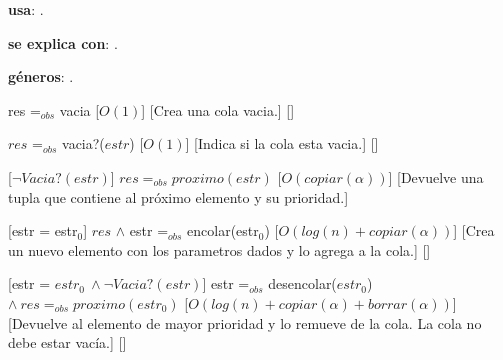 \begin{Interfaz}

  \textbf{usa}: .
  
  \textbf{se explica con}: .

  \textbf{g\'eneros}: .


  {res =$_{obs}$ vacia}%
  [$O(1)$]
  [Crea una cola vacia.]
  []

  {$res$ =$_{obs}$ vacia?($estr$)}%
  [$O(1)$]
  [Indica si la cola esta vacia.]
  []

  [$\neg Vacia?(estr)$]
  {$res =_{obs} proximo(estr)$}%
  [$O(copiar(\alpha))$]
  [Devuelve una tupla que contiene al pr\'oximo elemento y su prioridad.]
  

  [estr = estr$_0$]
  {$res$ $\wedge$ estr =$_{obs}$ encolar(estr$_0$)}%
  [$O(log(n) + copiar(\alpha))$]
  [Crea un nuevo elemento con los parametros dados y lo agrega a la cola.]
  []

  [estr = $estr_0 \ \wedge \neg Vacia?(estr)$] 
  {estr =$_{obs}$ desencolar($estr_0$) $\wedge \ res =_{obs} proximo(estr_0)$}%
  [$O(log(n) + copiar(\alpha) + borrar(\alpha))$]
  [Devuelve al elemento de mayor prioridad y lo remueve de la cola. La cola no debe estar vac\'ia.]
  []
  
  
\end{Interfaz}

\newpage

